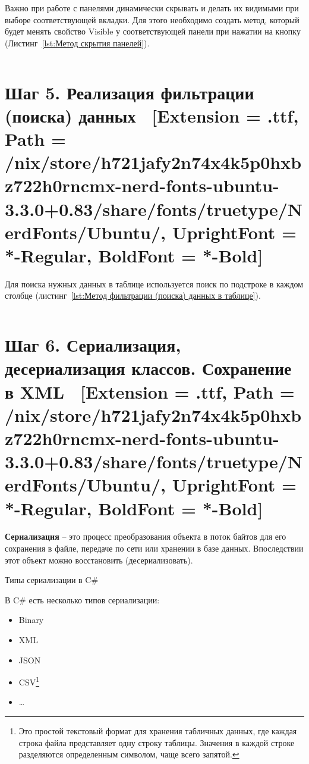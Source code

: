 \documentclass[12pt]{article}
\newcommand{\icon}[1]{\fontspec{UbuntuNerdFont}[Extension = .ttf,
  Path = /nix/store/h721jafy2n74x4k5p0hxbz722h0rncmx-nerd-fonts-ubuntu-3.3.0+0.83/share/fonts/truetype/NerdFonts/Ubuntu/,
  UprightFont = *-Regular,
BoldFont = *-Bold] #1}
\newcommand{\iicon}[1]{{\icon{#1}}}
\newcommand{\colorGIT}[1]{\textcolor{CtpLavender}{#1}}
\renewcommand{\texttt}[1]{{\small\ttfamily #1}}
\newenvironment{code}
  {\par\captionsetup{type=listing}\noindent}
  {\par\vspace{\baselineskip}}
\numberwithin{listing}{section}
\numberwithin{figure}{section}
\begin{document}
Важно при работе с панелями динамически скрывать и делать их видимыми при выборе соответствующей вкладки. Для этого необходимо создать метод, который будет менять свойство \texttt{Visible} у соответствующей панели при нажатии на кнопку (Листинг~\ref{lst:Метод скрытия панелей}).

\begin{code}
	\inputminted[firstline = 100, lastline=131]{csharp}{../2lab/WinFormsApp1example_/Form1.cs}
	\caption{\colorGIT{\href{https://github.com/WebMasterIT/Csharp_Labs/blob/c79e983c4cab3c416e44b6d5f9854b292fdeae26/2lab/WinFormsApp1example_/Form1.cs\#L100-L131}{Метод}} скрытия панелей}
	\label{lst:Метод скрытия панелей}
\end{code}

\newpage

\section{Шаг 5. Реализация фильтрации (поиска) данных \ \texorpdfstring{{\small{\iicon{}}}}{}}
Для поиска нужных данных в таблице используется поиск по подстроке в каждом столбце (листинг~\ref{lst:Метод фильтрации (поиска) данных в таблице}).

\begin{code}
	\inputminted[firstline = 280, lastline=341, fontsize={\fontsize{8}{8.4}}]{csharp}{../2lab/WinFormsApp1example_/Form1.cs}
	\caption{\colorGIT{\href{https://github.com/WebMasterIT/Csharp_Labs/blob/c79e983c4cab3c416e44b6d5f9854b292fdeae26/2lab/WinFormsApp1example_/Form1.cs\#L280-L341}{Метод}} фильтрации (поиска) данных в таблице}
	\label{lst:Метод фильтрации (поиска) данных в таблице}
\end{code}

\newpage

\section{Шаг 6. Сериализация, десериализация классов. Сохранение в XML \ \texorpdfstring{{\small{\iicon{}}}}{}}

\textbf{Сериализация} -- это процесс преобразования объекта в поток байтов для его сохранения в файле, передаче по сети или хранении в базе данных. Впоследствии этот объект можно восстановить (десериализовать).

Типы сериализации в \texttt{C\#}

В \texttt{C\#} есть несколько типов сериализации:
\begin{itemize}
	\item \texttt{Binary}
	\item \texttt{XML}
	\item \texttt{JSON}
	\item \texttt{CSV}\footnote{Это простой текстовый формат для хранения табличных данных, где каждая строка файла представляет одну строку таблицы. Значения в каждой строке разделяются определенным символом, чаще всего запятой.}
	\item \ldots
\end{itemize}
\end{document}
